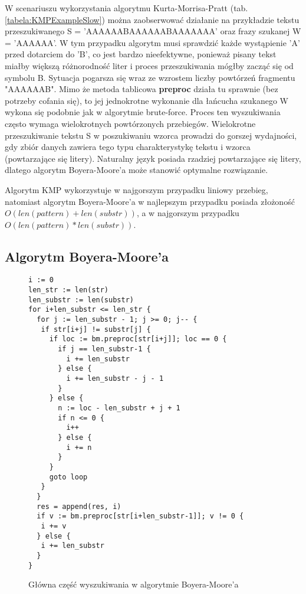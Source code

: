 W scenariuszu wykorzystania algorytmu Kurta-Morrisa-Pratt (tab. \ref{tabela:KMPExampleSlow})
można zaobserwować działanie na przykładzie tekstu przeszukiwanego S = 
'AAAAAABAAAAAABAAAAAAA' oraz frazy szukanej W = 'AAAAAA'. W tym przypadku algorytm musi sprawdzić każde
wystąpienie 'A' przed dotarciem do 'B', co jest bardzo nieefektywne, ponieważ
pisany tekst miałby większą różnorodność liter i proces przeszukiwania mógłby 
zacząć się od symbolu B. Sytuacja 
pogarsza się wraz ze wzrostem liczby powtórzeń fragmentu "AAAAAAB". Mimo że 
metoda tablicowa \textbf{preproc} działa tu sprawnie (bez potrzeby cofania się), to jej 
jednokrotne wykonanie dla łańcucha szukanego W wykona się podobnie jak w algorytmie
brute-force. Proces ten wyszukiwania często wymaga wielokrotnych powtórzonych przebiegów. 
Wielokrotne przeszukiwanie tekstu S w poszukiwaniu wzorca prowadzi do gorszej
wydajności, gdy zbiór danych zawiera tego typu 
charakterystykę tekstu i wzorca (powtarzające się litery). Naturalny język posiada
rzadziej powtarzające się litery, dlatego algorytm Boyera-Moore'a może stanowić 
optymalne rozwiązanie.

Algorytm KMP wykorzystuje w najgorszym przypadku liniowy przebieg, natomiast
algorytm Boyera-Moore'a w najlepszym przypadku posiada złożoność $O({len(pattern)}+{len(substr)})$, a w 
najgorszym przypadku $O({len(pattern)}*{len(substr)})$.

\subsection{Algorytm Boyera-Moore'a}
\label{sch:algoBoyerMoore}

\begin{figure}[htbp]
    \centering
    \begin{lstlisting}
i := 0
len_str := len(str)
len_substr := len(substr)
for i+len_substr <= len_str {
  for j := len_substr - 1; j >= 0; j-- {
   if str[i+j] != substr[j] {
     if loc := bm.preproc[str[i+j]]; loc == 0 {
       if j == len_substr-1 {
         i += len_substr
       } else {
         i += len_substr - j - 1
       }
     } else {
       n := loc - len_substr + j + 1
       if n <= 0 {
         i++
       } else {
         i += n
       }
     }
     goto loop
   }
  }
  res = append(res, i)
  if v := bm.preproc[str[i+len_substr-1]]; v != 0 {
   i += v
  } else {
   i += len_substr
  }
}
    \end{lstlisting}
    \caption{Główna część wyszukiwania w algorytmie Boyera-Moore'a}
    \label{fig:code:BMmain}
\end{figure}

